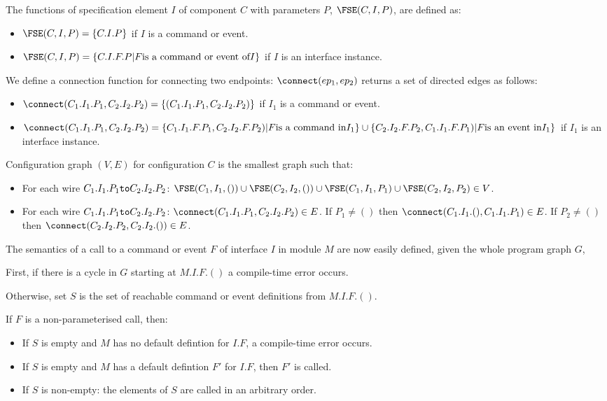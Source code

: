 \documentclass[11pt]{article}
\newcommand{\kw}[1]{{\tt #1}}
\begin{document}
The functions of specification element $I$ of component $C$ with parameters
$P$, $\FSE(C, I, P)$, are defined as:
\begin{itemize}
\item $\FSE(C, I, P) = \{ C.I.P \}$ if $I$ is a command or event.
\item $\FSE(C, I, P) = \{ C.I.F.P | F \mbox{is a command or event of} I \}$ if
$I$ is an interface instance.
\end{itemize}

We define a connection function for connecting two endpoints:
$\connect(ep_1, ep_2)$ returns a set of directed edges as follows:
\begin{itemize}
\item $\connect(C_1.I_1.P_1, C_2.I_2.P_2) = \{ (C_1.I_1.P_1, C_2.I_2.P_2)
\}$ if $I_1$ is a command or event.
\item $\connect(C_1.I_1.P_1, C_2.I_2.P_2) = 
\{ C_1.I_1.F.P_1, C_2.I_2.F.P_2) | F \mbox{is a command in} I_1 \} \cup
\{ C_2.I_2.F.P_2, C_1.I_1.F.P_1) | F \mbox{is an event in} I_1 \}$ if $I_1$ is an interface instance.
\end{itemize}

Configuration graph $(V,E)$ for configuration $C$ is the smallest graph
such that:
\begin{itemize}
\item For each wire $C_1.I_1.P_1 \kw{to} C_2.I_2.P_2$:
$\FSE(C_1, I_1, ()) \cup \FSE(C_2, I_2, ()) \cup \FSE(C_1, I_1, P_1) \cup
\FSE(C_2, I_2, P_2) \in V$.

\item For each wire $C_1.I_1.P_1 \kw{to} C_2.I_2.P_2$:
$\connect(C_1.I_1.P_1, C_2.I_2.P_2) \in E$. If $P_1 \not= ()$ then
$\connect(C_1.I_1.(), C_1.I_1.P_1) \in E$. If $P_2 \not= ()$ then
$\connect(C_2.I_2.P_2, C_2.I_2.()) \in E$.
\end{itemize}

The semantics of a call to a command or event $F$ of interface $I$ in
module $M$ are now easily defined, given the whole program graph $G$,

First, if there is a cycle in $G$ starting at $M.I.F.()$ a compile-time
error occurs.

Otherwise, set $S$ is the set of reachable command or event definitions
from $M.I.F.()$. 


If $F$ is a non-parameterised call, then:
\begin{itemize}
\item If $S$ is empty and $M$ has no default defintion for $I.F$, a
compile-time error occurs.
\item If $S$ is empty and $M$ has a default defintion $F'$ for $I.F$, then
$F'$ is called.
\item If $S$ is non-empty: the elements of $S$ are called in an arbitrary
order.
\end{itemize}
\end{document}

